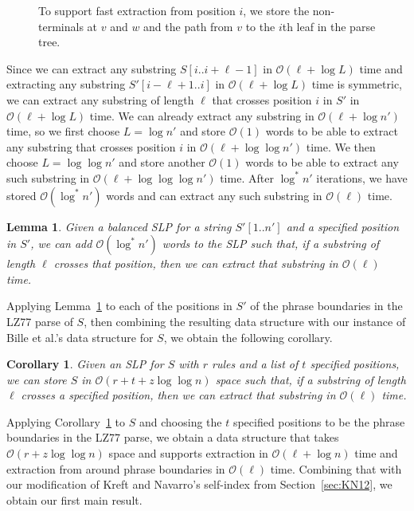 \documentclass[review]{elsarticle}
\newtheorem{lemma}[theorem]{Lemma}
\newtheorem{corollary}[theorem]{Corollary}
\newcommand{\Oh}[1]
    {\ensuremath{\mathcal{O}\!\left( {#1} \right)}}
\begin{document}
\begin{figure}[t]
\begin{center}
\caption{To support fast extraction from position $i$, we store the non-terminals at $v$ and $w$ and the path from $v$ to the $i$th leaf in the parse tree.}
\label{fig:bookmark}
\end{center}
\end{figure}

Since we can extract any substring \(S [i..i + \ell - 1]\) in $\Oh{\ell + \log L}$ time and extracting any substring \(S' [i - \ell + 1..i]\) in $\Oh{\ell + \log L}$ time is symmetric, we can extract any substring of length $\ell$ that crosses position $i$ in $S'$ in $\Oh{\ell + \log L}$ time.  We can already extract any substring in $\Oh{\ell + \log n'}$ time, so we first choose \(L = \log n'\) and store $\Oh{1}$ words to be able to extract any substring that crosses position $i$ in $\Oh{\ell + \log \log n'}$ time.  We then choose \(L = \log \log n'\) and store another $\Oh{1}$ words to be able to extract any such substring in $\Oh{\ell + \log \log \log n'}$ time.  After \(\log^* n'\) iterations, we have stored $\Oh{\log^* n'}$ words and can extract any such substring in $\Oh{\ell}$ time.

\begin{lemma} \label{lem:bookmark}
Given a balanced SLP for a string \(S' [1..n']\) and a specified position in $S'$, we can add $\Oh{\log^* n'}$ words to the SLP such that, if a substring of length $\ell$ crosses that position, then we can extract that substring in $\Oh{\ell}$ time.
\end{lemma}

Applying Lemma~\ref{lem:bookmark} to each of the positions in $S'$ of the phrase boundaries in the LZ77 parse of $S$, then combining the resulting data structure with our instance of Bille et al.'s data structure for $S$, we obtain the following corollary.

\begin{corollary} \label{cor:extraction}
Given an SLP for $S$ with $r$ rules and a list of $t$ specified positions, we can store $S$ in $\Oh{r + t + z \log \log n}$ space such that, if a substring of length $\ell$ crosses a specified position, then we can extract that substring in $\Oh{\ell}$ time.
\end{corollary}

Applying Corollary~\ref{cor:extraction} to $S$ and choosing the $t$ specified positions to be the phrase boundaries in the LZ77 parse, we obtain a data structure that takes $\Oh{r + z \log \log n}$ space and supports extraction in $\Oh{\ell + \log n}$ time and extraction from around phrase boundaries in $\Oh{\ell}$ time.  Combining that with our modification of Kreft and Navarro's self-index from Section~\ref{sec:KN12}, we obtain our first main result.
\end{document}
